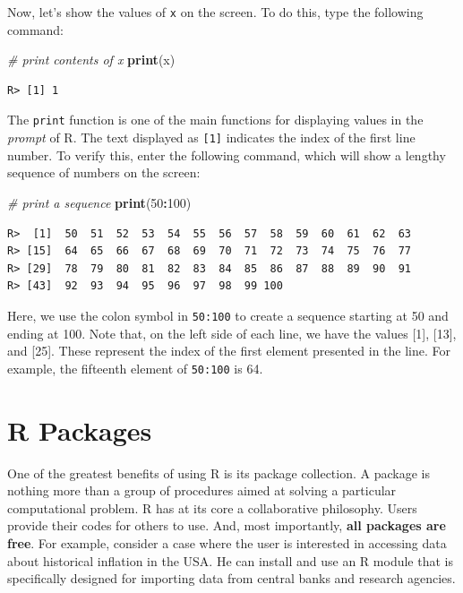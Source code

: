 \documentclass[
  12pt,
]{book}
\newenvironment{Shaded}{\begin{snugshade}}{\end{snugshade}}
\newcommand{\CommentTok}[1]{\textcolor[rgb]{0.37,0.37,0.37}{\textit{#1}}}
\newcommand{\DecValTok}[1]{\textcolor[rgb]{0.06,0.06,0.06}{#1}}
\newcommand{\KeywordTok}[1]{\textcolor[rgb]{0.27,0.27,0.27}{\textbf{#1}}}
\newcommand{\NormalTok}[1]{#1}
\newcommand{\OperatorTok}[1]{\textcolor[rgb]{0.43,0.43,0.43}{\textbf{#1}}}
\begin{document}
Now, let's show the values of \texttt{x} on the screen. To do this, type the following command:

\begin{Shaded}
\begin{Highlighting}[]
\CommentTok{# print contents of x}
\KeywordTok{print}\NormalTok{(x)}
\end{Highlighting}
\end{Shaded}

\begin{verbatim}
R> [1] 1
\end{verbatim}

The \texttt{print} function is one of the main functions for displaying values in the \emph{prompt} of R. The text displayed as \texttt{{[}1{]}} indicates the index of the first line number. To verify this, enter the following command, which will show a lengthy sequence of numbers on the screen: 

\begin{Shaded}
\begin{Highlighting}[]
\CommentTok{# print a sequence}
\KeywordTok{print}\NormalTok{(}\DecValTok{50}\OperatorTok{:}\DecValTok{100}\NormalTok{)}
\end{Highlighting}
\end{Shaded}

\begin{verbatim}
R>  [1]  50  51  52  53  54  55  56  57  58  59  60  61  62  63
R> [15]  64  65  66  67  68  69  70  71  72  73  74  75  76  77
R> [29]  78  79  80  81  82  83  84  85  86  87  88  89  90  91
R> [43]  92  93  94  95  96  97  98  99 100
\end{verbatim}

Here, we use the colon symbol in \texttt{50:100} to create a sequence starting at 50 and ending at 100. Note that, on the left side of each line, we have the values {[}1{]}, {[}13{]}, and {[}25{]}. These represent the index of the first element presented in the line. For example, the fifteenth element of \texttt{50:100} is 64.

\hypertarget{r-packages}{%
\section{R Packages}\label{r-packages}}

One of the greatest benefits of using R is its package collection. A package is nothing more than a group of procedures aimed at solving a particular computational problem. R has at its core a collaborative philosophy. Users provide their codes for others to use. And, most importantly, \textbf{all packages are free}. For example, consider a case where the user is interested in accessing data about historical inflation in the USA. He can install and use an R module that is specifically designed for importing data from central banks and research agencies.
\end{document}
